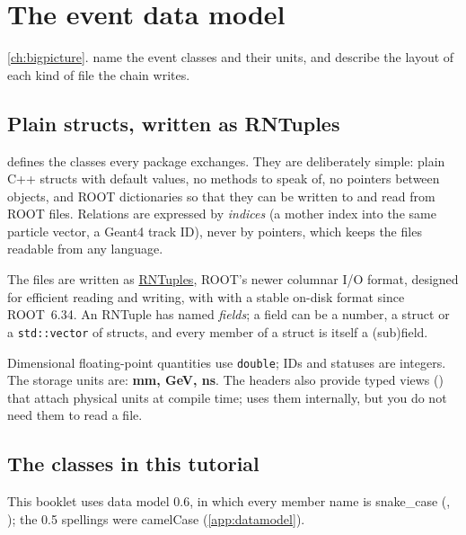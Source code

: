 \chapter{The event data model}
\label{ch:datamodel}

{\cref{ch:bigpicture}.}
{name the event classes and their units, and describe the layout of each kind of file the chain writes.}

\section{Plain structs, written as RNTuples}

 defines the classes every package exchanges. They are
deliberately simple: plain C++ structs with default values, no methods to
speak of, no pointers between objects, and ROOT dictionaries so that they can
be written to and read from ROOT files. Relations are expressed by
\emph{indices} (a mother index into the same particle vector, a Geant4 track
ID), never by pointers, which keeps the files readable from any language.

The files are written as \href{https://root.cern/doc/latest/classROOT_1_1RNTuple.html}{RNTuples},
ROOT's newer columnar I/O format, designed for efficient reading and writing, with
with a stable on-disk format since ROOT~6.34. An RNTuple has named
\emph{fields}; a field can be a number, a struct or a \texttt{std::vector} of
structs, and every member of a struct is itself a (sub)field.

Dimensional floating-point quantities use \texttt{double}; IDs and statuses
are integers. The storage units are:
\textbf{mm, GeV, ns}. The headers also provide typed views
() that attach physical units at compile time;
 uses them internally, but you do not need them to read a file.

\section{The classes in this tutorial}

This booklet uses data model 0.6, in which every member name is snake\_case
(, ); the 0.5 spellings were camelCase
(\cref{app:datamodel}).

